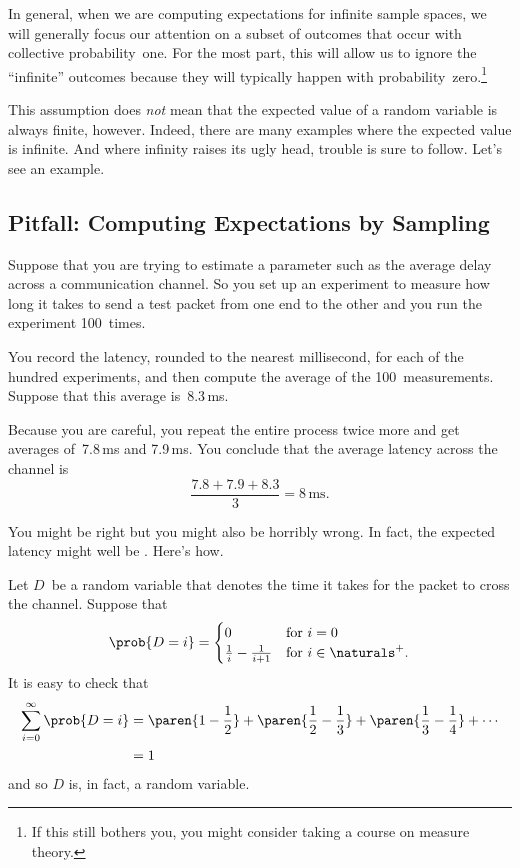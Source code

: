 In general, when we are computing expectations for infinite sample
spaces, we will generally focus our attention on a subset of outcomes
that occur with collective probability~one.  For the most part, this
will allow us to ignore the ``infinite'' outcomes because they will
typically happen with probability~zero.\footnote{If this still bothers
  you, you might consider taking a course on measure theory.}

This assumption does \emph{not} mean that the expected value of a
random variable is always finite, however.  Indeed, there are many
examples where the expected value is infinite.  And where infinity
raises its ugly head, trouble is sure to follow.  Let's see an
example.

\subsection{Pitfall: Computing Expectations by Sampling}
\label{sec:latency}

Suppose that you are trying to estimate a parameter such as the
average delay across a communication channel.  So you set up an
experiment to measure how long it takes to send a test packet from one
end to the other and you run the experiment 100~times.

You record the latency, rounded to the nearest millisecond, for each
of the hundred experiments, and then compute the average of the
100~measurements.  Suppose that this average is~8.3\,ms.

Because you are careful, you repeat the entire process twice more and
get averages of~7.8\,ms and 7.9\,ms.  You conclude that the average
latency across the channel is
\begin{equation*}
    \frac{7.8 + 7.9 + 8.3}{3} = 8\,\mathrm{ms}.
\end{equation*}

You might be right but you might also be horribly wrong.  In fact, the
expected latency might well be .  Here's how.

Let $D$~be a random variable that denotes the time it takes for the
packet to cross the channel.  Suppose that 
\begin{equation}\label{eqn:17T1}
\prob{D = i} = \begin{cases}
                0 & \text{for $i = 0$} \\
                \frac{1}{i} - \frac{1}{i + 1}   & \text{for $i \in \naturals^+$}.
               \end{cases}
\end{equation}
It is easy to check that
\begin{align*}
\sum_{i = 0}^\infty \prob{D = i}
    &= \paren{1 - \frac{1}{2}} + \paren{\frac{1}{2} - \frac{1}{3}}
        + \paren{\frac{1}{3} - \frac{1}{4}} + \cdots \\
    &= 1
\end{align*}
and so $D$ is, in fact, a random variable.

